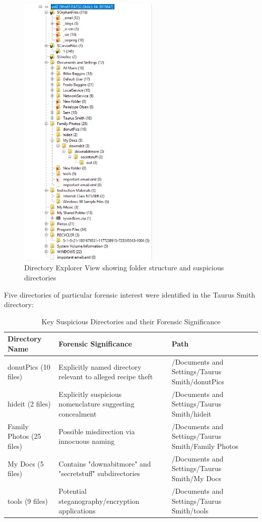 \begin{figure}[htbp]
    \centering
    \includegraphics[width=0.6\textwidth]{images/Evidence Examination/Image3.png}
    \caption{Directory Explorer View showing folder structure and suspicious directories}
    \label{fig:directory_explorer}
\end{figure}

Five directories of particular forensic interest were identified in the Taurus Smith directory:

\begin{table}[htbp]
\centering
\begin{tabular}{|p{3cm}|p{6cm}|p{5cm}|}
\hline
\textbf{Directory Name} & \textbf{Forensic Significance} & \textbf{Path} \\
\hline
donutPics (10 files) & Explicitly named directory relevant to alleged recipe theft & /Documents and Settings/Taurus Smith/donutPics \\
\hline
hideit (2 files) & Explicitly suspicious nomenclature suggesting concealment & /Documents and Settings/Taurus Smith/hideit \\
\hline
Family Photos (25 files) & Possible misdirection via innocuous naming & /Documents and Settings/Taurus Smith/Family Photos \\
\hline
My Docs (5 files) & Contains "downabitmore" and "secretstuff" subdirectories & /Documents and Settings/Taurus Smith/My Docs \\
\hline
tools (9 files) & Potential steganography/encryption applications & /Documents and Settings/Taurus Smith/tools \\
\hline
\end{tabular}
\caption{Key Suspicious Directories and their Forensic Significance}
\label{table:suspicious_directories}
\end{table}


